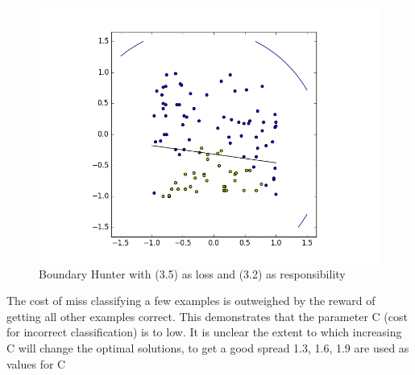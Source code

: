 \documentclass[notitlepage]{report}
\theoremstyle{definition}
\begin{document}
\begin{figure}[H]
\centering
  \begin{minipage}[b]{0.4\textwidth}
    \includegraphics[width=\textwidth]{BoundaryHunter-Attempt3-01.png}
    \caption{Boundary Hunter with (3.5) as loss and (3.2) as responsibility}
    \label{fig:boundaryhunter-l2-01}
  \end{minipage}
  \hfill
\end{figure}

The cost of miss classifying a few examples is outweighed by the reward of getting all other examples correct. This demonstrates that the parameter C (cost for incorrect classification) is to low. It is unclear the extent to which increasing C will change the optimal solutions, to get a good spread 1.3, 1.6, 1.9 are used as values for C
\end{document}
